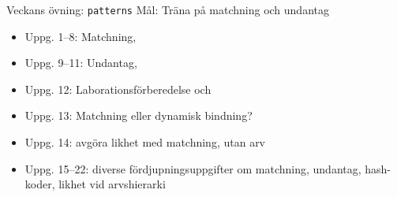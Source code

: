 



\begin{Slide}{Veckans övning: \texttt{patterns}}
  Mål: Träna på matchning och undantag
\begin{itemize}
\item Uppg. 1--8: Matchning, 
\item Uppg. 9--11: Undantag, 
\item Uppg. 12: Laborationsförberedelse  och 
\item Uppg. 13: Matchning eller dynamisk bindning?
\item Uppg. 14: avgöra likhet med matchning,  utan arv
\item Uppg. 15--22: diverse fördjupningsuppgifter om matchning, undantag, hash-koder, likhet vid arvshierarki
\end{itemize}
\end{Slide}


